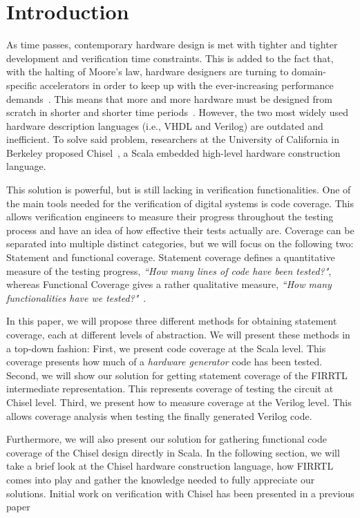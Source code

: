 \documentclass[runningheads]{llncs}
\newcommand{\martin}[1]{{\color{blue} Martin: #1}}
\renewcommand{\martin}[1]{}
\begin{document}
\section{Introduction}
\label{sec:objectives}
As time passes, contemporary hardware design is met with tighter and tighter development and verification time constraints. This is added to the fact that, with the halting of Moore's law, hardware designers are turning to domain-specific accelerators in order to keep up with the ever-increasing performance demands~\cite{henn-patt:turing:2019}. This means that more and more hardware must be designed from scratch in shorter and shorter time periods~\cite{domain-hw-acc:2020}. However, the two most widely used hardware description languages (i.e., VHDL and Verilog) are outdated and inefficient. To solve said problem, researchers at the University of California in Berkeley proposed Chisel~\cite{chisel:dac2012}, a Scala embedded high-level hardware construction language.

This solution is powerful, but is still lacking in verification functionalities. One of the main tools needed for the verification of digital systems is code coverage. This allows verification engineers to measure their progress throughout the testing process and have an idea of how effective their tests actually are. Coverage can be separated into multiple distinct categories, but we will focus on the following two: Statement and functional coverage. Statement coverage defines a quantitative measure of the testing progress, \textit{``How many lines of code have been tested?"}, whereas Functional Coverage gives a rather qualitative measure, \textit{``How many functionalities have we tested?"}~\cite{spear2008systemverilog}.


In this paper, we will propose three different methods for obtaining statement coverage, each at different levels of abstraction. We will present these methods in a top-down fashion: First, we present code coverage at the Scala level. This coverage presents how much of a \emph{hardware generator} code has been tested. 
Second, we will show our solution for getting statement coverage of the FIRRTL intermediate representation. This represents coverage of testing the circuit at Chisel level. Third, we present how to measure coverage at the Verilog level. This allows coverage analysis when testing the finally generated Verilog code.

Furthermore, we will also present our solution for gathering functional code coverage of the Chisel design directly in Scala. In the following section, we will take a brief look at the Chisel hardware construction language, how FIRRTL comes into play and gather the knowledge needed to fully appreciate our solutions. Initial work on verification with Chisel has been presented in a previous paper~\cite{blind} %
\end{document}
